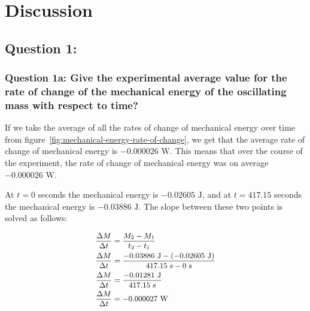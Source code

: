 \documentclass[titlepage]{article}
\begin{document}
    
    \section{Discussion}\label{sec:discussion}
        
        \subsection{Question 1:}\label{subsec:question-1}
            
            \subsubsection{Question 1a: Give the experimental average value for the rate of change of the mechanical energy of the oscillating mass with respect to time?}
                If we take the average of all the rates of change of mechanical energy over time from figure~\ref{fig:mechanical-energy-rate-of-change}, we get that the average rate of change of mechanical energy is $-0.000026 \text{ W}$.
                This means that over the course of the experiment, the rate of change of mechanical energy was on average $-0.000026 \text{ W}$.
                
                At $t=0$ seconds the mechanical energy is $-0.02605 \text{ J}$, and at $t=417.15$ seconds the mechanical energy is $-0.03886 \text{ J}$.
                The slope between these two points is solved as follows:
                
                \begin{equation}
                    \small
                    \begin{aligned}
                        \frac{\Delta M}{\Delta t} &= \frac{M_2 - M_1}{t_2 - t_1} \\
                        \frac{\Delta M}{\Delta t} &= \frac{-0.03886 \text{ J} - (-0.02605 \text{ J})}{417.15 \text{ s} - 0 \text{ s}} \\
                        \frac{\Delta M}{\Delta t} &= \frac{-0.01281 \text{ J}}{417.15 \text{ s}} \\
                        \frac{\Delta M}{\Delta t} &= -0.000027 \text{ W} \\
                    \end{aligned}\label{eq:rate-of-change-of-mechanical-energy-over-time-overall}
                \end{equation}
                
\end{document}
